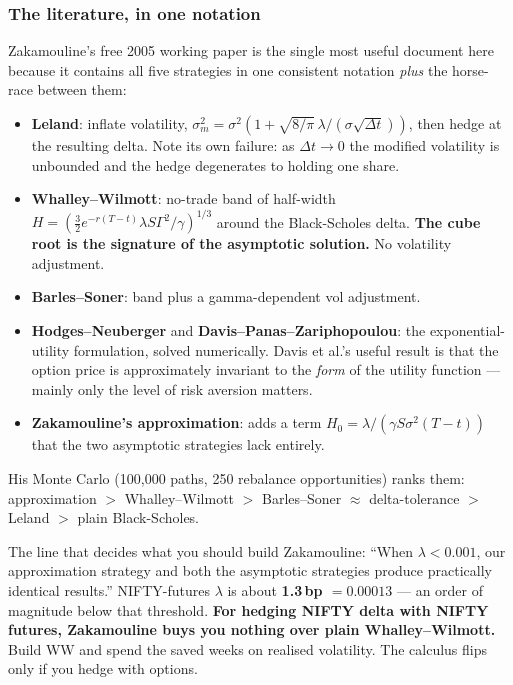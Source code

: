 \documentclass[11pt,a4paper]{article}
\begin{document}
\subsubsection{The literature, in one notation}

Zakamouline's free 2005 working paper is the single most useful document here
because it contains all five strategies in one consistent notation \emph{plus}
the horse-race between them:

\begin{itemize}
\item \textbf{Leland}: inflate volatility, $\sigma_m^2 = \sigma^2(1 + \sqrt{8/\pi}\,\lambda/(\sigma\sqrt{\Delta t}))$, then hedge at the resulting delta. Note its own failure: as $\Delta t \to 0$ the modified volatility is unbounded and the hedge degenerates to holding one share.
\item \textbf{Whalley--Wilmott}: no-trade band of half-width
$H = \left(\tfrac{3}{2} e^{-r(T-t)} \lambda S \Gamma^2 / \gamma\right)^{1/3}$
around the Black-Scholes delta. \textbf{The cube root is the signature of the
asymptotic solution.} No volatility adjustment.
\item \textbf{Barles--Soner}: band plus a gamma-dependent vol adjustment.
\item \textbf{Hodges--Neuberger} and \textbf{Davis--Panas--Zariphopoulou}: the
exponential-utility formulation, solved numerically. Davis et al.'s useful result
is that the option price is approximately invariant to the \emph{form} of the
utility function --- mainly only the level of risk aversion matters.
\item \textbf{Zakamouline's approximation}: adds a term $H_0 = \lambda/(\gamma S \sigma^2 (T-t))$ that the two asymptotic strategies lack entirely.
\end{itemize}

His Monte Carlo (100{,}000 paths, 250 rebalance opportunities) ranks them:
approximation $>$ Whalley--Wilmott $>$ Barles--Soner $\approx$ delta-tolerance
$>$ Leland $>$ plain Black-Scholes.

\begin{keyfact}{The line that decides what you should build}
Zakamouline: ``When $\lambda < 0.001$, our approximation strategy and both the
asymptotic strategies produce practically identical results.'' NIFTY-futures
$\lambda$ is about \textbf{1.3\,bp $= 0.00013$} --- an order of magnitude below
that threshold. \textbf{For hedging NIFTY delta with NIFTY futures, Zakamouline
buys you nothing over plain Whalley--Wilmott.} Build WW and spend the saved weeks
on realised volatility. The calculus flips only if you hedge with options.
\end{keyfact}
\end{document}
